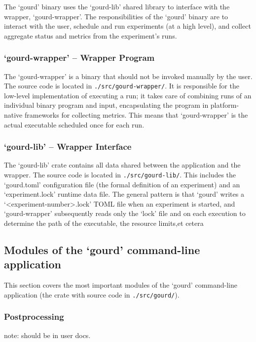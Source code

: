The `gourd' binary uses the `gourd-lib' shared library to interface with
the wrapper, `gourd-wrapper'.
The responsibilities of the `gourd' binary are to interact with the user,
schedule and run experiments (at a high level), and collect aggregate
status and metrics from the experiment's runs.

\subsubsection{`gourd-wrapper' -- Wrapper Program}

The `gourd-wrapper' is a binary that should not be invoked manually by the user.
The source code is located in \verb|./src/gourd-wrapper/|.
It is responsible for the low-level implementation of executing a run;
it takes care of combining runs of an individual binary program and input,
encapsulating the program in platform-native frameworks for collecting metrics.
This means that `gourd-wrapper' is the actual executable scheduled once for each run.

\subsubsection{`gourd-lib' -- Wrapper Interface}

The `gourd-lib' crate contains all data shared between the application and the wrapper.
The source code is located in \verb|./src/gourd-lib/|.
This includes the `gourd.toml' configuration file (the formal definition of an experiment)
and an `experiment.lock' runtime data file.
The general pattern is that `gourd' writes a `<experiment-number>.lock' TOML file when
an experiment is started, and `gourd-wrapper' subsequently reads only the `lock' file and
on each execution to determine the path of the executable, the resource limits,et cetera


\subsection{Modules of the `gourd' command-line application}

This section covers the most important modules of the `gourd' command-line application
(the crate with source code in \verb|./src/gourd/|).


\subsubsection{Postprocessing}
note: should be in user docs.

